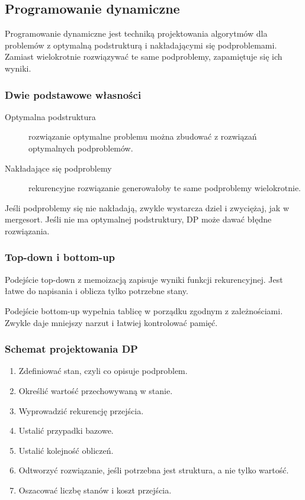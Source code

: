 \subsection{Programowanie dynamiczne}

Programowanie dynamiczne jest techniką projektowania algorytmów dla problemów z optymalną podstrukturą i nakładającymi się podproblemami. Zamiast wielokrotnie rozwiązywać te same podproblemy, zapamiętuje się ich wyniki.

\subsubsection{Dwie podstawowe własności}

\begin{description}
  \item[Optymalna podstruktura] rozwiązanie optymalne problemu można zbudować z rozwiązań optymalnych podproblemów.
  \item[Nakładające się podproblemy] rekurencyjne rozwiązanie generowałoby te same podproblemy wielokrotnie.
\end{description}

Jeśli podproblemy się nie nakładają, zwykle wystarcza dziel i zwyciężaj, jak w mergesort. Jeśli nie ma optymalnej podstruktury, DP może dawać błędne rozwiązania.

\subsubsection{Top-down i bottom-up}

Podejście top-down z memoizacją zapisuje wyniki funkcji rekurencyjnej. Jest łatwe do napisania i oblicza tylko potrzebne stany.

Podejście bottom-up wypełnia tablicę w porządku zgodnym z zależnościami. Zwykle daje mniejszy narzut i łatwiej kontrolować pamięć.

\subsubsection{Schemat projektowania DP}

\begin{enumerate}
  \item Zdefiniować stan, czyli co opisuje podproblem.
  \item Określić wartość przechowywaną w stanie.
  \item Wyprowadzić rekurencję przejścia.
  \item Ustalić przypadki bazowe.
  \item Ustalić kolejność obliczeń.
  \item Odtworzyć rozwiązanie, jeśli potrzebna jest struktura, a nie tylko wartość.
  \item Oszacować liczbę stanów i koszt przejścia.
\end{enumerate}

